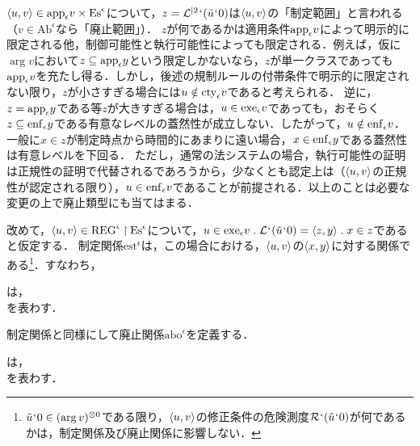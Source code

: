 $\langle u,v \rangle\in\mathrm{app}_{\epsilon}v\times\mathrm{Es}^{\epsilon}$について，$ z = \mathcal{L}^{\mid 2}{\mspace{1mu}{`}\mspace{1mu}}(\tilde{u}{\mspace{1mu}{`}\mspace{1mu}} 0)$は$\langle u,v \rangle$の「制定範囲」と言われる（$v\in\mathrm{Ab}^{\epsilon}$なら「廃止範囲」）．
$z$が何であるかは適用条件$ \mathrm{app}_{\epsilon} v $によって明示的に限定される他，制御可能性と執行可能性によっても限定される．例えば，仮に$\arg v$において$ z\subseteq\mathrm{app}_{\epsilon}y $という限定しかないなら，$z$が単一クラスであっても$\mathrm{app}_{\epsilon}v$を充たし得る．しかし，後述の規制ルールの付帯条件で明示的に限定されない限り，$z$が小さすぎる場合には$ u\notin\mathrm{cty}_{\epsilon}v $であると考えられる．
逆に，$ z = \mathrm{app}_{\epsilon} y $である等$z$が大きすぎる場合は，$u\in\mathrm{exe}_{\epsilon} v$であっても，おそらく$ z\subseteq\mathrm{enf}_{\epsilon}y $である有意なレベルの蓋然性が成立しない．したがって，$ u\notin\mathrm{enf}_{\epsilon}v $．一般に$x\in z$が制定時点から時間的にあまりに遠い場合，$x\in\mathrm{enf}_{\epsilon}y$である蓋然性は有意レベルを下回る．
ただし，通常の法システムの場合，執行可能性の証明は正規性の証明で代替されるであろうから，少なくとも認定上は（$ \langle u,v \rangle $の正規性が認定される限り），$ u\in\mathrm{enf}_{\epsilon}v $であることが前提される．以上のことは必要な変更の上で廃止類型にも当てはまる．

改めて，$ \langle u,v \rangle\in\mathrm{REG}^\epsilon\mathbin{\upharpoonright}\mathrm{Es}^\epsilon $について，$ u\in\exe{\epsilon} v\con{1}\mathcal{L}\fap(\tilde{u}\fap 0) = \orp{z,y}\con{1}x\in z $であると仮定する．
制定関係$ \mathrm{est}^\epsilon $は，この場合における，$ \langle u,v \rangle $の$ \langle x,y \rangle $に対する関係である\footnote{
    $\tilde{u}{\mspace{1mu}{`}\mspace{1mu}} 0\in(\arg v)^{\otimes 0}$である限り，$\langle u,v \rangle$の修正条件の危険測度$\mathcal{R}{\mspace{1mu}{`}\mspace{1mu}}(\tilde{u}{\mspace{1mu}{`}\mspace{1mu}} 0)$が何であるかは，制定関係及び廃止関係に影響しない．
}．すなわち，

\begin{df}
\label{df:制定関係}
は，\\\hfill
{}を表わす．
\end{df}

\noindent 制定関係と同様にして廃止関係$\mathrm{abo}^\epsilon$を定義する．

\begin{df}
\label{df:廃止関係}
は，\\\hfill
{}を表わす．
\end{df}

